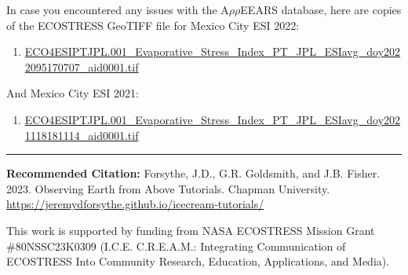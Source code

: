 \documentclass[oneside,a4paper,11pt,explicit]{book}
\begin{document}
\begin{tcolorbox}[colback=yellow!5!white,title=\textbf{Datafiles}]
	\large
	In case you encountered any issues with the A$\rho\rho$EEARS database, here are copies of the ECOSTRESS GeoTIFF file for Mexico City ESI 2022:
	\begin{enumerate}
		\item \href{https://jeremydforsythe.github.io/icecream-tutorials/Tutorial8_ESI/ECO4ESIPTJPL.001_Evaporative_Stress_Index_PT_JPL_ESIavg_doy2022095170707_aid0001.tif}{\small ECO4ESIPTJPL.001\_Evaporative\_Stress\_Index\_PT\_JPL\_ESIavg\_doy2022095170707\_aid0001.tif}
	\end{enumerate}
	And Mexico City ESI 2021:
	\begin{enumerate}
		\item \href{https://jeremydforsythe.github.io/icecream-tutorials-main/Tutorial8_ESI/ECO4ESIPTJPL.001_Evaporative_Stress_Index_PT_JPL_ESIavg_doy2021118181114_aid0001.tif}{\small ECO4ESIPTJPL.001\_Evaporative\_Stress\_Index\_PT\_JPL\_ESIavg\_doy2021118181114\_aid0001.tif}
	\end{enumerate}
\end{tcolorbox}


\hrule

\vspace{1em}

\small \textbf{Recommended Citation:} Forsythe, J.D., G.R. Goldsmith, and J.B. Fisher. 2023. Observing Earth from Above Tutorials. Chapman University. \url{https://jeremydforsythe.github.io/icecream-tutorials/}

\vspace{1em}

This work is supported by funding from NASA ECOSTRESS Mission Grant \#80NSSC23K0309 (I.C.E. C.R.E.A.M.: Integrating Communication of ECOSTRESS Into Community Research, Education, Applications, and Media).
\end{document}
